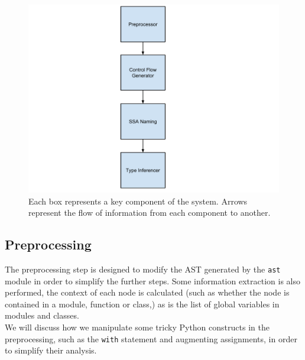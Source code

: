\documentclass[12pt, titlepage]{article}
\begin{document}
\begin{figure}
\centering
\includegraphics[scale=0.5]{images/systemStructure.pdf}
\caption{Each box represents a key component of the system. Arrows represent the flow of information from each component to another.}
\label{fig:systemStructure}
\end{figure}

\subsection{Preprocessing}
The preprocessing step is designed to modify the AST generated by the \texttt{ast} module in order to simplify the further steps. Some information extraction is also performed, the context of each node is calculated (such as whether the node is contained in a module, function or class,) as is the list of global variables in modules and classes. \\
\indent We will discuss how we manipulate some tricky Python constructs in the preprocessing, such as the \texttt{with} statement and augmenting assignments, in order to simplify their analysis.
\end{document}
